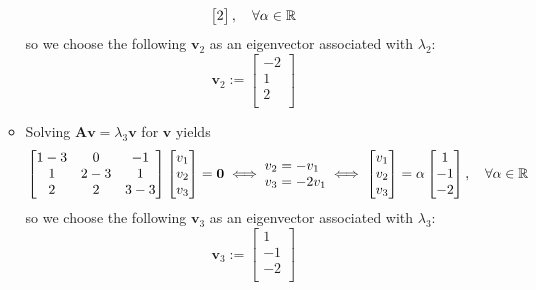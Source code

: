 \documentclass[12pt,a4paper]{article}
\begin{document}
\begin{itemize}
\begin{itemize}
\begin{equation}
\begin{bmatrix}
        2 \\
      \end{bmatrix},
      \quad \forall \alpha \in \mathbb{R}
    \end{equation}
    so we choose the following $\bm{v}_{2}$ as an eigenvector associated with $\lambda_{2}$:
    \begin{equation}\nonumber%
      \bm{v}_{2} := 
      \begin{bmatrix}
        -2 \\
        1 \\
        2 \\
      \end{bmatrix}
    \end{equation}

  \item Solving $\bm{A}\bm{v}=\lambda_{3}\bm{v}$ for $\bm{v}$ yields
    \begin{equation}\nonumber%
      \begin{bmatrix}
        1-3 & 0 & -1 \\
        1 & 2-3 & 1 \\
        2 & 2 & 3-3 \\
      \end{bmatrix}
      \begin{bmatrix}
        v_{1} \\
        v_{2} \\
        v_{3} \\
      \end{bmatrix}
      = \bm{0}
      \iff
      \begin{matrix*}[l]
        v_{2} = -v_{1} \\
        v_{3} = -2v_{1} \\
      \end{matrix*}
      \iff
      \begin{bmatrix}
        v_{1} \\
        v_{2} \\
        v_{3} \\
      \end{bmatrix}
      =
      \alpha
      \begin{bmatrix}
        1 \\
        -1 \\
        -2 \\
      \end{bmatrix},
      \quad \forall \alpha \in \R
    \end{equation}
    so we choose the following $\bm{v}_{3}$ as an eigenvector associated with $\lambda_{3}$:
    \begin{equation}\nonumber%
      \bm{v}_{3} := 
      \begin{bmatrix}
        1 \\
        -1 \\
        -2 \\
      \end{bmatrix}
    \end{equation}


\end{itemize}
\end{itemize}
\end{document}
